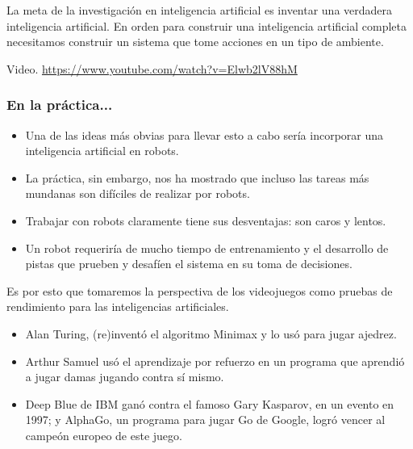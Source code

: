 \documentclass[aspectratio=169]{beamer}
\begin{document}
\begin{frame}
\begin{center}
La meta de la investigación en inteligencia artificial es inventar una
verdadera inteligencia artificial. En orden para construir una inteligencia
artificial completa necesitamos construir un sistema que tome acciones en un
tipo de ambiente.
\end{center}
\end{frame}

\begin{frame}
\begin{center}
Video.
\url{https://www.youtube.com/watch?v=Elwb2lV88hM}
\end{center}
\end{frame}

\begin{frame}
\frametitle{En la práctica...}
\begin{itemize}[<+->]
\item Una de las ideas más obvias para llevar esto a cabo sería incorporar una
  inteligencia artificial en robots.
\item La práctica, sin embargo, nos ha mostrado que incluso las tareas más
  mundanas son difíciles de realizar por robots. 
\item Trabajar con robots claramente tiene sus desventajas: son caros y lentos.
\item Un robot requeriría de mucho tiempo de entrenamiento y el desarrollo de
  pistas que prueben y desafíen el sistema en su toma de decisiones.
\end{itemize}
\end{frame}

\begin{frame}
\begin{center}
Es por esto que tomaremos la perspectiva de los videojuegos como pruebas de
rendimiento para las inteligencias artificiales.
\end{center}
\end{frame}

\begin{frame}
\begin{itemize}[<+->]
\item Alan Turing, (re)inventó el algoritmo Minimax y lo usó para jugar ajedrez.
\item Arthur Samuel usó el aprendizaje por refuerzo en un programa que aprendió a jugar
damas jugando contra sí mismo.
\item Deep Blue de IBM ganó contra el famoso Gary Kasparov, en un evento en
1997; y AlphaGo, un programa para jugar Go de Google, logró vencer al
campeón europeo de este juego.
\end{itemize}
\end{frame}
\end{document}
